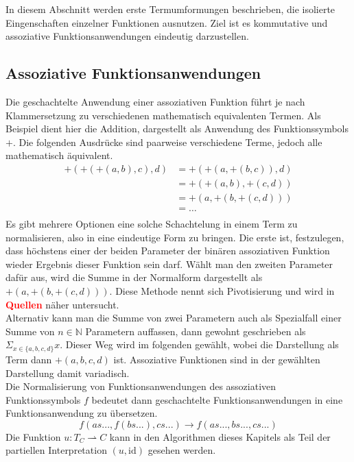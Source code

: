 \documentclass{article}
\begin{document}
In diesem Abschnitt werden erste Termumformungen beschrieben, die isolierte Eingenschaften einzelner Funktionen ausnutzen. Ziel ist es kommutative und assoziative Funktionsanwendungen eindeutig darzustellen.\\

\subsection {Assoziative Funktionsanwendungen}
Die geschachtelte Anwendung einer assoziativen Funktion führt je nach Klammersetzung zu verschiedenen mathematisch equivalenten Termen. Als Beispiel dient hier die Addition, dargestellt als Anwendung des Funktionssymbols $+$. Die folgenden Ausdrücke sind paarweise verschiedene Terme, jedoch alle mathematisch äquivalent.
\begin{equation*}
	\begin{split}
	+(+(+(a, b), c), d) &= +(+(a, +(b, c)), d)\\
	&= +(+(a, b), +(c, d))\\
	&= +(a, +(b, +(c, d)))\\
	&= \dots \\
	\end{split}
\end{equation*}
Es gibt mehrere Optionen eine solche Schachtelung in einem Term zu normalisieren, also in eine eindeutige Form zu bringen. Die erste ist, festzulegen, dass höchstens einer der beiden Parameter der binären assoziativen Funktion wieder Ergebnis dieser Funktion sein darf. Wählt man den zweiten Parameter dafür aus, wird die Summe in der Normalform dargestellt als $+(a, +(b, +(c, d)))$. Diese Methode nennt sich Pivotisierung und wird in \textcolor{red}{\textbf{Quellen}} näher untersucht.\\
Alternativ kann man die Summe von zwei Parametern auch als Spezialfall einer Summe von $n \in \mathbb{N}$ Parametern auffassen, dann gewohnt geschrieben als $\Sigma_{x \in \{a, b, c, d\}} x$. Dieser Weg wird im folgenden gewählt, wobei die Darstellung als Term dann $+(a, b, c, d)$ ist. Assoziative Funktionen sind in der gewählten Darstellung damit variadisch. \\
Die Normalisierung von Funktionsanwendungen des assoziativen Funktionssymbols $f$ bedeutet dann geschachtelte Funktionsanwendungen in eine Funktionsanwendung zu übersetzen. 
$$f(as..., f(bs...), cs...) \rightarrow f(as..., bs..., cs...)$$
Die Funktion $u \colon T_C \rightharpoonup C$ kann in den Algorithmen dieses Kapitels als Teil der partiellen Interpretation $(u, \mathrm{id})$ gesehen werden. 
\end{document}
